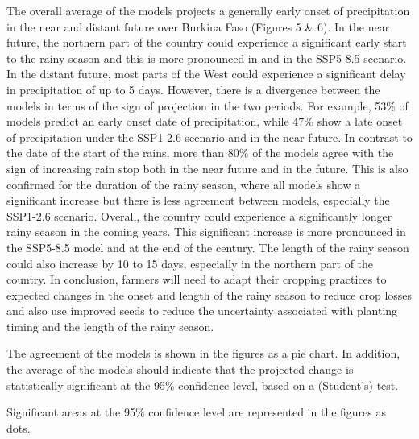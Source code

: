 \documentclass[
]{book}
\begin{document}
The overall average of the models projects a generally early onset of precipitation in the near and distant future over Burkina Faso (Figures 5 \& 6). In the near future, the northern part of the country could experience a significant early start to the rainy season and this is more pronounced in and in the SSP5-8.5 scenario. In the distant future, most parts of the West could experience a significant delay in precipitation of up to 5 days. However, there is a divergence between the models in terms of the sign of projection in the two periods. For example, 53\% of models predict an early onset date of precipitation, while 47\% show a late onset of precipitation under the SSP1-2.6 scenario and in the near future. In contrast to the date of the start of the rains, more than 80\% of the models agree with the sign of increasing rain stop both in the near future and in the future. This is also confirmed for the duration of the rainy season, where all models show a significant increase but there is less agreement between models, especially the SSP1-2.6 scenario. Overall, the country could experience a significantly longer rainy season in the coming years. This significant increase is more pronounced in the SSP5-8.5 model and at the end of the century. The length of the rainy season could also increase by 10 to 15 days, especially in the northern part of the country. In conclusion, farmers will need to adapt their cropping practices to expected changes in the onset and length of the rainy season to reduce crop losses and also use improved seeds to reduce the uncertainty associated with planting timing and the length of the rainy season.

The agreement of the models is shown in the figures as a pie chart. In addition, the average of the models should indicate that the projected change is statistically significant at the 95\% confidence level, based on a (Student's) test.

Significant areas at the 95\% confidence level are represented in the figures as dots.
\end{document}
